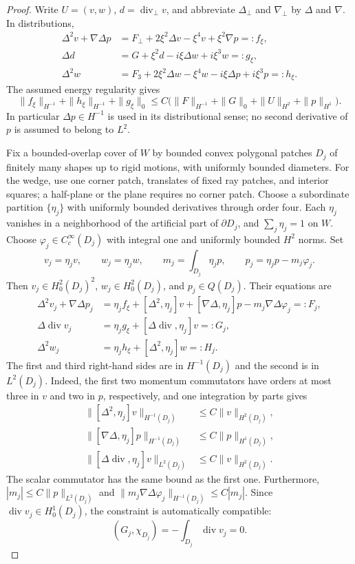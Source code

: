 \documentclass[11pt,a4paper]{article}
\theoremstyle{remark}
\numberwithin{equation}{section}
\begin{document}
\begin{proof}
Write $U=(v,w)$, $d=\operatorname{div}_\perp v$, and abbreviate
$\Delta_\perp$ and $\nabla_\perp$ by $\Delta$ and $\nabla$. In distributions,
\[
\begin{aligned}
 \Delta^2v+\nabla\Delta p
 &=F_\perp+2\xi^2\Delta v-\xi^4v+\xi^2\nabla p=:f_\xi,\\
 \Delta d
 &=G+\xi^2d-i\xi\Delta w+i\xi^3w=:g_\xi,\\
 \Delta^2w
 &=F_3+2\xi^2\Delta w-\xi^4w-i\xi\Delta p+i\xi^3p=:h_\xi.
\end{aligned}
\]
The assumed energy regularity gives
\begin{equation}\label{eq:g-edge-lowfreq-data}
 \|f_\xi\|_{H^{-1}}+\|h_\xi\|_{H^{-1}}+\|g_\xi\|_0
 \le C\bigl(\|F\|_{H^{-1}}+\|G\|_0+
                  \|U\|_{H^2}+\|p\|_{H^1}\bigr).
\end{equation}
In particular $\Delta p\in H^{-1}$ is used in its distributional sense;
no second derivative of $p$ is assumed to belong to $L^2$.

Fix a bounded-overlap cover of $W$ by bounded convex polygonal patches
$D_j$ of finitely many shapes up to rigid motions, with uniformly bounded
diameters. For the wedge, use one corner patch, translates of fixed ray
patches, and interior squares; a half-plane or the plane requires no corner
patch. Choose a subordinate partition $\{\eta_j\}$ with uniformly bounded
derivatives through order four. Each $\eta_j$ vanishes in a neighborhood of
the artificial part of $\partial D_j$, and $\sum_j\eta_j=1$ on $W$.
Choose $\varphi_j\in C_c^\infty(D_j)$ with integral one and uniformly
bounded $H^2$ norms. Set
\[
 v_j=\eta_jv,\qquad w_j=\eta_jw,\qquad
 m_j=\int_{D_j}\eta_jp,\qquad p_j=\eta_jp-m_j\varphi_j.
\]
Then $v_j\in H^2_0(D_j)^2$, $w_j\in H^2_0(D_j)$, and
$p_j\in Q(D_j)$. Their equations are
\[
\begin{aligned}
 \Delta^2v_j+\nabla\Delta p_j
 &=\eta_jf_\xi+[\Delta^2,\eta_j]v
       +[\nabla\Delta,\eta_j]p-m_j\nabla\Delta\varphi_j=:F_j,\\
 \Delta\operatorname{div}v_j
 &=\eta_jg_\xi+[\Delta\operatorname{div},\eta_j]v=:G_j,\\
 \Delta^2w_j&=\eta_jh_\xi+[\Delta^2,\eta_j]w=:H_j.
\end{aligned}
\]
The first and third right-hand sides are in $H^{-1}(D_j)$ and the second
is in $L^2(D_j)$. Indeed, the first two momentum commutators have orders
at most three in $v$ and two in $p$, respectively, and one integration
by parts gives
\[
\begin{aligned}
 \|[\Delta^2,\eta_j]v\|_{H^{-1}(D_j)}
 &\le C\|v\|_{H^2(D_j)},\\
 \|[\nabla\Delta,\eta_j]p\|_{H^{-1}(D_j)}
 &\le C\|p\|_{H^1(D_j)},\\
 \|[\Delta\operatorname{div},\eta_j]v\|_{L^2(D_j)}
 &\le C\|v\|_{H^2(D_j)}.
\end{aligned}
\]
The scalar commutator has the same bound as the first one. Furthermore,
$|m_j|\le C\|p\|_{L^2(D_j)}$ and
$\|m_j\nabla\Delta\varphi_j\|_{H^{-1}(D_j)}\le C|m_j|$.
Since $\operatorname{div}v_j\in H^1_0(D_j)$, the constraint is automatically
compatible:
\[
 (G_j,\chi_{D_j})=-\int_{D_j}\operatorname{div}v_j=0.
\]


\end{proof}
\end{document}
